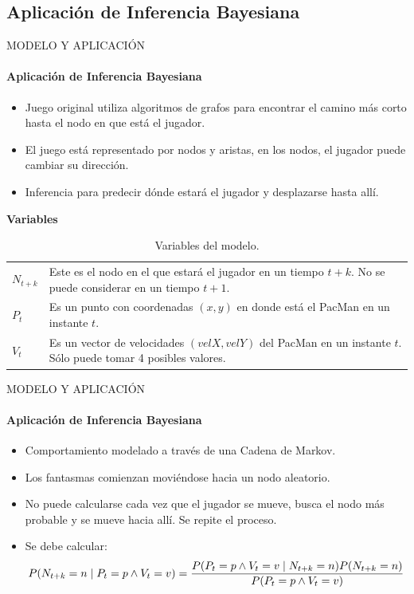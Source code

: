 \subsection{Aplicación de Inferencia Bayesiana}

\begin{frame}{MODELO Y APLICACIÓN}
    \framesubtitle{Aplicación de Inferencia Bayesiana}
    \begin{itemize}
        \item Juego original utiliza algoritmos de grafos para encontrar el camino más corto hasta el nodo en que está el jugador.
        \item El juego está representado por nodos y aristas, en los nodos, el jugador puede cambiar su dirección.
        \item Inferencia para predecir dónde estará el jugador y desplazarse hasta allí.
    \end{itemize}

    \textbf{Variables}
    \begin{table}[H]
    \centering

    \begin{tabular}{l p{8cm}}
    \hline
     $N_{t+k}$ & Este es el nodo en el que estará el jugador en un tiempo $t+k$. No se puede considerar en un tiempo $t+1$.\\
     $P_t$ &  Es un punto con coordenadas $(x,y)$ en donde está el PacMan en un instante $t$.\\
     $V_t$ &  Es un vector de velocidades $(velX,velY)$ del PacMan en un instante $t$. Sólo puede tomar 4 posibles valores.\\ \hline
    \end{tabular}
    \caption{Variables del modelo.}
    \end{table}
    \end{frame}

    \begin{frame}{MODELO Y APLICACIÓN}
        \framesubtitle{Aplicación de Inferencia Bayesiana}
        \begin{itemize}
            \item Comportamiento modelado a través de una Cadena de Markov.
            \item Los fantasmas comienzan moviéndose hacia un nodo aleatorio.
            \item No puede calcularse cada vez que el jugador se mueve, busca el nodo más probable y se mueve hacia allí. Se repite el proceso.
            \item Se debe calcular:
            \begin{equation}
                \small P({ N }_{ t+k }=n\mid { P }_{ t }=p\wedge { V }_{ t}=v)=\frac{P({ P }_{ t }=p\wedge { V }_{ t}=v\mid{ N }_{ t+k }=n)P({ N }_{ t+k }=n)}{P({ P }_{ t }=p\wedge { V }_{ t}=v)}
            \end{equation}
        \end{itemize}
    \end{frame}
